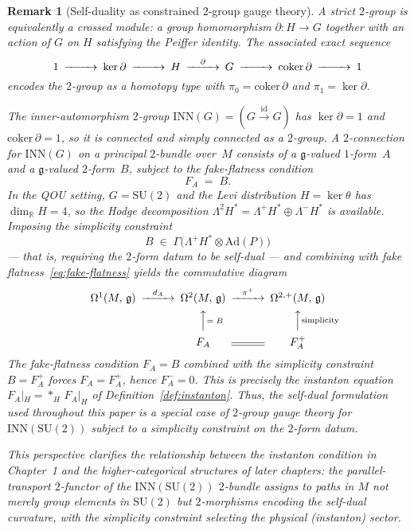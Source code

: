 \documentclass[12pt,a4paper]{report}
\newtheorem{remark}[theorem]{Remark}
\begin{document}
\begin{remark}[Self-duality as constrained $2$-group gauge theory]
\label{rem:self-dual-2group}
A strict $2$-group is equivalently a \emph{crossed module}: a
group homomorphism $\partial \colon H \to G$ together with an
action of $G$ on $H$ satisfying the Peiffer identity.  The
associated exact sequence
\begin{equation}\label{eq:crossed-module-ses}
\begin{CD}
1 @>>> \ker\partial @>>> H @>{\partial}>> G @>>>
  \mathrm{coker}\,\partial @>>> 1
\end{CD}
\end{equation}
encodes the $2$-group as a homotopy type with
$\pi_0 = \mathrm{coker}\,\partial$ and
$\pi_1 = \ker\partial$.

The \emph{inner-automorphism $2$-group}
$\mathrm{INN}(G) = (G \xrightarrow{\mathrm{id}} G)$
has $\ker\partial = 1$ and $\mathrm{coker}\,\partial = 1$, so it is
connected and simply connected as a $2$-group.  A $2$-connection for
$\mathrm{INN}(G)$ on a principal $2$-bundle over~$M$ consists of a
$\mathfrak{g}$-valued $1$-form~$A$ and a $\mathfrak{g}$-valued
$2$-form~$B$, subject to the \emph{fake-flatness} condition
\begin{equation}\label{eq:fake-flatness}
F_A \;=\; B.
\end{equation}
In the QOU setting, $G = \mathrm{SU}(2)$ and the Levi distribution
$H = \ker\theta$ has $\dim_{\mathbb{R}} H = 4$, so the Hodge
decomposition $\Lambda^2 H^* = \Lambda^+\!H^* \oplus \Lambda^-\!H^*$
is available.  Imposing the \emph{simplicity constraint}
\[
  B \;\in\; \Gamma\!\bigl(\Lambda^+\!H^* \otimes \mathrm{Ad}(P)\bigr)
\]
--- that is, requiring the $2$-form datum to be self-dual ---
and combining with fake flatness~\eqref{eq:fake-flatness} yields
the commutative diagram
\begin{equation}\label{eq:2group-instanton}
\begin{CD}
\Omega^1(M,\,\mathfrak{g})
  @>{d_A}>>
  \Omega^2(M,\,\mathfrak{g})
  @>{\pi^+}>>
  \Omega^{2,+}(M,\,\mathfrak{g}) \\
@.  @AA{=\;B}A  @AA{\text{simplicity}}A \\
@.  F_A @= F_A^+
\end{CD}
\end{equation}
The fake-flatness condition $F_A = B$ combined with the simplicity
constraint $B = F_A^+$ forces $F_A = F_A^+$, hence $F_A^- = 0$.
This is precisely the instanton equation
$F_A|_H = {*_H}\,F_A|_H$
of Definition~\ref{def:instanton}.  Thus, the self-dual formulation
used throughout this paper is a special case of $2$-group gauge theory
for $\mathrm{INN}(\mathrm{SU}(2))$ subject to a simplicity constraint
on the $2$-form datum.

This perspective clarifies the relationship between the instanton
condition in Chapter~1 and the higher-categorical structures of later
chapters: the parallel-transport $2$-functor of the
$\mathrm{INN}(\mathrm{SU}(2))$ $2$-bundle assigns to paths in $M$
not merely group elements in $\mathrm{SU}(2)$ but $2$-morphisms
encoding the self-dual curvature, with the simplicity constraint
selecting the physical (instanton) sector.
\end{remark}
\end{document}

